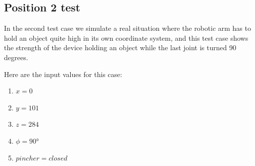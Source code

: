 		\subsection{Position 2 test}
		
			\hspace{15pt}In the second test case we simulate a real situation where the robotic arm has to hold an object quite high in its own coordinate system, and this test case shows the strength of the device holding an object while the last joint is turned 90 degrees.

			Here are the input values for this case:

			\begin{enumerate}
				\item $x = 0$ \\
				\item $y = 101$ \\
				\item $z = 284$ \\
				\item $\phi = 90°$ \\
				\item $pincher = closed$ \\
			\end{enumerate}
		
